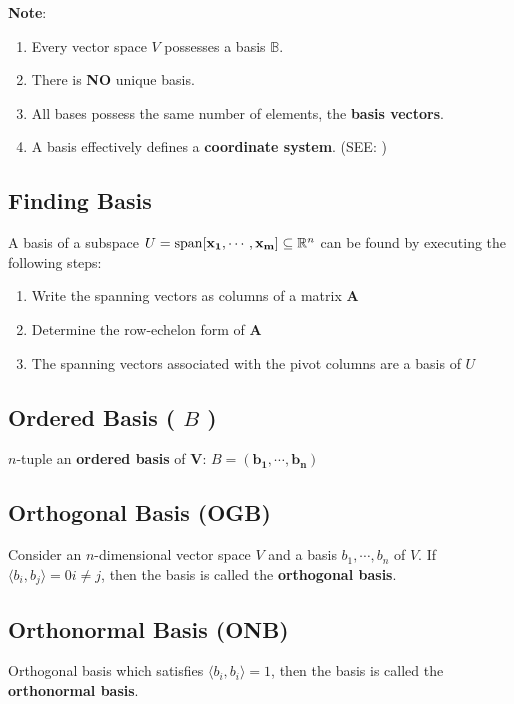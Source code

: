 \vspace{0.2cm}
\textbf{Note}:
\begin{enumerate}
    \item Every vector space $V$ possesses a basis $\mathbb{B}$. 
    
    \item There is \textbf{NO} unique basis. 
    
    \item All bases possess the same number of elements, the \textbf{basis vectors}.

    \item A basis effectively defines a \textbf{coordinate system}. (SEE: )
\end{enumerate}

\subsection{Finding Basis \cite{mfml-1}}
A basis of a subspace $U = \operatorname{span}[\mathbf{x_1, \cdots, x_m}] \subseteq \mathbb{R}^n$ can be found by executing the following steps:
\begin{enumerate}
    \item Write the spanning vectors as columns of a matrix $\mathbf{A}$
    \item Determine the row-echelon form of $\mathbf{A}$
    \item The spanning vectors associated with the pivot columns are a basis of $U$
\end{enumerate}


\subsection{Ordered Basis ( $\mathit{B}$ ) \cite{mfml-1}}\label{ordered basis}
$n$-tuple an \textbf{ordered basis} of $\mathbf{V}$: $\mathit{B} = (\mathbf{b_1, \cdots, b_n})$


\subsection{Orthogonal Basis (OGB) \cite{mfml-1}}\label{Orthogonal Basis (OGB)}
Consider an $n$-dimensional vector space $V$ and a basis ${b_1, \cdots , b_n}$ of $V$. If $\langle b_i , b_j \rangle = 0 i \neq j$, then the basis is called the \textbf{orthogonal basis}.


\subsection{Orthonormal Basis (ONB) \cite{mfml-1}}\label{Orthonormal Basis (ONB)}
Orthogonal basis which satisfies $\langle b_i , b_i \rangle = 1$, then the basis is called the \textbf{orthonormal basis}.

